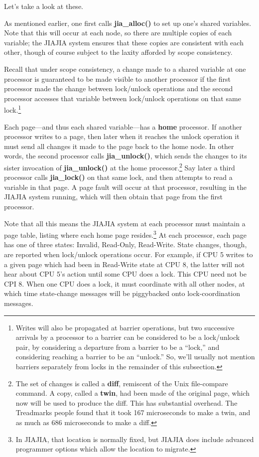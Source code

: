 Let's take a look at these.

As mentioned earlier, one first calls {\bf jia\_alloc()} to set up one's
shared variables.  Note that this will occur at each node, so there are
multiple copies of each variable; the JIAJIA system ensures that these
copies are consistent with each other, though of course subject to the
laxity afforded by scope consistency.

Recall that under scope consistency, a change made to a shared variable
at one processor is guaranteed to be made visible to another processor
if the first processor made the change between lock/unlock operations
and the second processor accesses that variable between lock/unlock
operations on that same lock.\footnote{Writes will also be propagated at
barrier operations, but two successive arrivals by a processor to a
barrier can be considered to be a lock/unlock pair, by considering a
departure from a barrier to be a ``lock,'' and considering reaching a
barrier to be an ``unlock.'' So, we'll usually not mention barriers
separately from locks in the remainder of this subsection.}

Each page---and thus each shared variable---has a {\bf home} processor.
If another processor writes to a page, then later when it reaches the
unlock operation it must send all changes it made to the page back to
the home node.  In other words, the second processor calls {\bf
jia\_unlock()}, which sends the changes to its sister invocation of {\bf
jia\_unlock()} at the home processor.\footnote{The set of changes is
called a {\bf diff}, remiscent of the Unix file-compare command.  A
copy, called a {\bf twin}, had been made of the original page, which now
will be used to produce the diff.  This has substantial overhead.  The
Treadmarks people found that it took 167 microseconds to make a twin,
and as much as 686 microseconds to make a diff.} Say later a third
processor calls {\bf jia\_lock()} on that same lock, and then attempts
to read a variable in that page.  A page fault will occur at that
processor, resulting in the JIAJIA system running, which will then
obtain that page from the first processor.

Note that all this means the JIAJIA system at each processor must
maintain a page table, listing where each home page resides.\footnote{In
JIAJIA, that location is normally fixed, but JIAJIA does include
advanced programmer options which allow the location to migrate.}  At
each processor, each page has one of three states:  Invalid, Read-Only,
Read-Write.  State changes, though, are reported when lock/unlock
operations occur.  For example, if CPU 5 writes to a given page which
had been in Read-Write state at CPU 8, the latter will not hear about
CPU 5's action until some CPU does a lock.  This CPU need not be
CPI 8.  When one CPU does a lock, it must coordinate with all other
nodes, at which time state-change messages will be piggybacked onto
lock-coordination messages.

